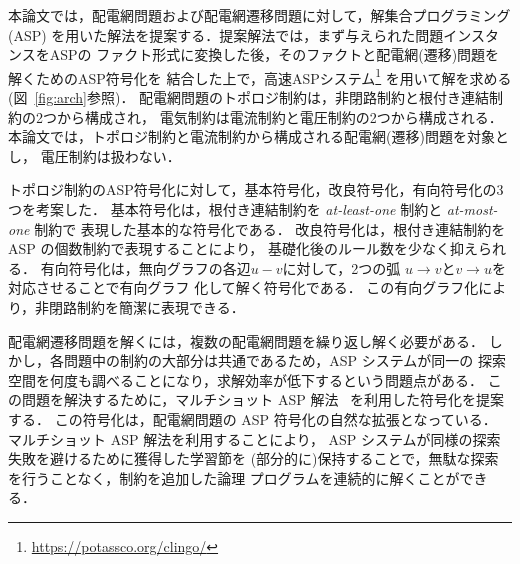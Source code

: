 


本論文では，配電網問題および配電網遷移問題に対して，解集合プログラミング(ASP)
を用いた解法を提案する．提案解法では，まず与えられた問題インスタンスをASPの
ファクト形式に変換した後，そのファクトと配電網(遷移)問題を解くためのASP符号化を
結合した上で，高速ASPシステム{\clingo}\footnote{\url{https://potassco.org/clingo/}} 
を用いて解を求める(図~\ref{fig:arch}参照)．
%
配電網問題のトポロジ制約は，非閉路制約と根付き連結制約の2つから構成され，
電気制約は電流制約と電圧制約の2つから構成される．
本論文では，トポロジ制約と電流制約から構成される配電網(遷移)問題を対象とし，
電圧制約は扱わない．

トポロジ制約のASP符号化に対して，基本符号化，改良符号化，有向符号化の3つを考案した．
基本符号化は，根付き連結制約を \textit{at-least-one} 制約と \textit{at-most-one} 制約で
表現した基本的な符号化である．
改良符号化は，根付き連結制約を ASP の個数制約で表現することにより，
基礎化後のルール数を少なく抑えられる．
有向符号化は，無向グラフの各辺$u-v$に対して，2つの弧
$u\rightarrow v$と$v\rightarrow u$を対応させることで有向グラフ
化して解く符号化である．
この有向グラフ化により，非閉路制約を簡潔に表現できる．

配電網遷移問題を解くには，複数の配電網問題を繰り返し解く必要がある．
しかし，各問題中の制約の大部分は共通であるため，ASP システムが同一の
探索空間を何度も調べることになり，求解効率が低下するという問題点がある．
この問題を解決するために，マルチショット ASP 解法~\cite{DBLP:conf/rweb/KaminskiSW17}
を利用した符号化を提案する．
この符号化は，配電網問題の ASP 符号化の自然な拡張となっている．
マルチショット ASP 解法を利用することにより，
ASP システムが同様の探索失敗を避けるために獲得した学習節を
(部分的に)保持することで，無駄な探索を行うことなく，制約を追加した論理
プログラムを連続的に解くことができる．



